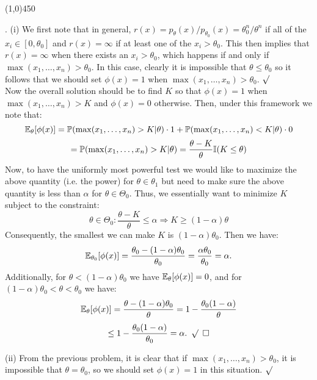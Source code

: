 \documentclass[12pt]{article}
\begin{document}
 \begin{center}
\line(1,0){450}
\end{center}

\pagebreak
{}. (i) We first note that in general, $r(x) = p_\theta(x) /p_{\theta_0}(x) = \theta_0^n / \theta^n$ if all of the $x_i \in [0,\theta_0]$ and $r(x) = \infty$ if at least one of the $x_i > \theta_0$. This then implies that $r(x) = \infty$ when there exists an $x_i > \theta_0$, which happens if and only if $\max(x_1,\dots,x_n) > \theta_0$. In this case, clearly it is impossible that $\theta \leq \theta_0$ so it follows that we should set $\phi(x) = 1$ when $\max (x_1,\dots,x_n) > \theta_0$. $\surd$\\

\noindent
Now the overall solution should be to find $K$ so that $\phi(x) =1$ when $\max (x_1,\dots,x_n) > K$ and $\phi(x)=0$ otherwise. Then, under this framework we note that:
$$ \mathbb{E}_\theta[\phi(x)] = \mathbb{P}(\max(x_1,\dots,x_n)>K|\theta)\cdot 1+\mathbb{P}(\max(x_1,\dots,x_n)<K|\theta)\cdot 0$$
$$= \mathbb{P}(\max(x_1,\dots,x_n)>K|\theta) = \frac{\theta-K}{\theta}\mathbb{I}(K \leq \theta)$$
Now, to have the uniformly most powerful test we would like to maximize the above quantity (i.e. the power) for $\theta \in \theta_1$ but need to make sure the above quantity is less than $\alpha$ for $\theta\in\Theta_0$. Thus, we essentially want to minimize $K$ subject to the constraint:
$$\theta\in\Theta_0: \frac{\theta-K}{\theta} \leq \alpha \Rightarrow K \geq (1-\alpha)\theta$$ 
Consequently, the smallest we can make $K$ is $(1-\alpha)\theta_0$. Then we have:
$$\mathbb{E}_{\theta_0}[\phi(x)] = \frac{\theta_0-(1-\alpha)\theta_0}{\theta_0} 
= \frac{\alpha\theta_0}{\theta_0} 
= \alpha.$$
Additionally, for $\theta < (1-\alpha)\theta_0$ we have $\mathbb{E}_{\theta}[\phi(x)] = 0$, and for $(1-\alpha)\theta_0 < \theta < \theta_0$ we have:
$$\mathbb{E}_{\theta}[\phi(x)]  = \frac{\theta-(1-\alpha)\theta_0}{\theta}
= 1-\frac{\theta_0(1-\alpha)}{\theta}$$
$$\leq  1-\frac{\theta_0(1-\alpha)}{\theta_0}
= \alpha. 
\hspace{5 pt} \surd 
\hspace{5 pt} \square$$

\noindent
(ii) From the previous problem, it is clear that if $\max(x_1,\dots,x_n) > \theta_0$, it is impossible that $\theta=\theta_0$, so we should set $\phi(x)=1$ in this situation. $\surd$\\
\end{document}
